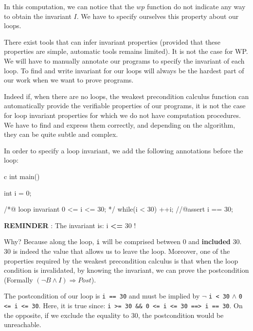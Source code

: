 In this computation, we can notice that the $wp$ function do not
indicate any way to obtain the invariant $I$. We have to specify
ourselves this property about our loops.





There exist tools that can infer invariant properties (provided that
these properties are simple, automatic tools remains limited). It is not
the case for WP. We will have to manually annotate our programs to
specify the invariant of each loop. To find and write invariant for our
loops will always be the hardest part of our work when we want to prove
programs.



Indeed if, when there are no loops, the weakest precondition calculus
function can automatically provide the verifiable properties of our
programs, it is not the case for loop invariant properties for which we
do not have computation procedures. We have to find and express them
correctly, and depending on the algorithm, they can be quite subtle and
complex.



In order to specify a loop invariant, we add the following annotations
before the loop:



\begin{CodeBlock}{c}
int main(){
  int i = 0;
  
  /*@
    loop invariant 0 <= i <= 30;
  */
  while(i < 30){
    ++i;
  }
  //@assert i == 30;
}
\end{CodeBlock}



\begin{Warning}
  \textbf{REMINDER} : The invariant is: i \textbf{<=} 30 !
\end{Warning}


Why? Because along the loop, \texttt{i} will be comprised between 0 and
\textbf{included} 30. 30 is indeed the value that allows us to leave the
loop. Moreover, one of the properties required by the weakest
precondition calculus is that when the loop condition is invalidated, by
knowing the invariant, we can prove the postcondition (Formally
$(\neg B \wedge I) \Rightarrow Post$).

The postcondition of our loop is \texttt{i == 30} and must be implied
by $\neg$ \texttt{i < 30} $\wedge$
\texttt{0 <= i <= 30}. Here, it is true since:
\texttt{i >= 30 \&\& 0 <= i <= 30 ==> i == 30}.
On the opposite, if we exclude the equality to 30, the postcondition
would be unreachable.




